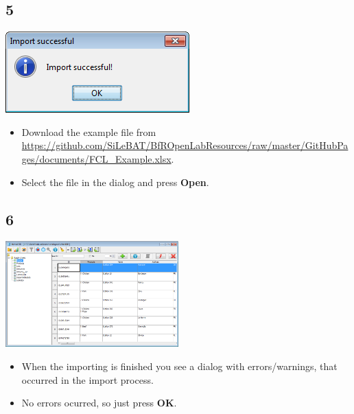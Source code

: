 \documentclass{beamer}
\begin{document}
\subsection{5}
\begin{frame}
	\begin{center}
  		\includegraphics[height=0.6\textheight]{5.png}
	\end{center}
	\begin{itemize}
		\item Download the example file from \url{https://github.com/SiLeBAT/BfROpenLabResources/raw/master/GitHubPages/documents/FCL_Example.xlsx}.
		\item Select the file in the dialog and press \textbf{Open}.
	\end{itemize}
\end{frame}

\subsection{6}
\begin{frame}
	\begin{center}
  		\includegraphics[width=0.5\textwidth]{6.png}
	\end{center}
	\begin{itemize}
		\item When the importing is finished you see a dialog with errors/warnings, that occurred in the import process.
		\item No errors ocurred, so just press \textbf{OK}.
	\end{itemize}
\end{frame}
\end{document}
